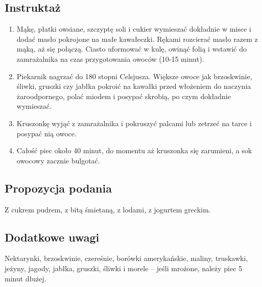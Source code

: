 \subsection*{Instruktaż}
\begin{enumerate}
    \item Mąkę, płatki owsiane, szczyptę soli i cukier wymieszać dokładnie w misce i dodać masło pokrojone na małe kawałeczki. Rękami rozcierać masło razem z mąką, aż się połączą. Ciasto uformować w kulę, owinąć folią i wstawić do zamrażalnika na czas przygotowania owoców (10-15 minut).
    \item Piekarnik nagrzać do 180 stopni Celsjusza. Większe owoce jak brzoskwinie, śliwki, gruszki czy jabłka pokroić na kawałki przed włożeniem do naczynia żaroodpornego, polać miodem i posypać skrobią, po czym dokładnie wymieszać.
    \item Kruszonkę wyjąć z zamrażalnika i pokruszyć palcami lub zetrzeć na tarce i posypać nią owoce.
    \item Całość piec około 40 minut, do momentu aż kruszonka się zarumieni, a sok owocowy zacznie bulgotać.
\end{enumerate}

\vspace{0.5cm}

\small
\subsection*{Propozycja podania}
Z cukrem pudrem, z bitą śmietaną, z lodami, z jogurtem greckim.

\vspace{0.3cm}

\subsection*{Dodatkowe uwagi}
Nektarynki, brzoskwinie, czereśnie, borówki amerykańskie, maliny, truskawki, jeżyny, jagody, jabłka, gruszki, śliwki i morele – jeśli mrożone, należy piec 5 minut dłużej.

\newpage
